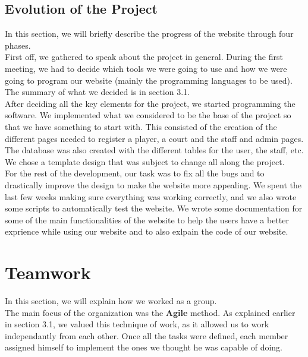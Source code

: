\documentclass[a4paper, 12pt]{article}
\begin{document}
\subsection{Evolution of the Project}

In this section, we will briefly describe the progress of the website through four phases.\\

First off, we gathered to speak about the project in general. During the first meeting, we had to decide which tools we were going to use and how we were going to program our website (mainly the programming languages to be used). The summary of what we decided is in section 3.1.\\

After deciding all the key elements for the project, we started programming the software. We implemented what we considered to be the base of the project so that we have something to start with. This consisted of the creation of the different pages needed to register a player, a court and the staff and admin pages. The database was also created with the different tables for the user, the staff, etc. We chose a template design that was subject to change all along the project.\\

For the rest of the development, our task was to fix all the bugs and to drastically improve the design to make the website more appealing. We spent the last few weeks making sure everything was working correctly, and we also wrote some scripts to automatically test the website. We wrote some documentation for some of the main functionalities of the website to help the users have a better exprience while using our website and to also exlpain the code of our website.

\section{Teamwork}

In this section, we will explain how we worked as a group.\\

The main focus of the organization was the \textbf{Agile} method. As explained earlier in section 3.1, we valued this technique of work, as it allowed us to work independantly from each other. Once all the tasks were defined, each member assigned himself to implement the ones we thought he was capable of doing.\\
\end{document}
